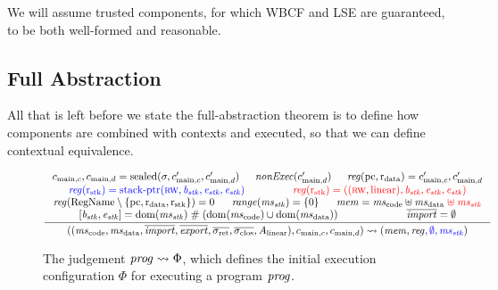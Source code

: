 \documentclass[acmsmall,screen]{acmart}\settopmatter{}
\renewcommand{\RegName}{\shareddom{RegName}}
\renewcommand{\nonExec}[1]{\plainfun{nonExec}{#1}}
\begin{document}
We will assume trusted components, for which WBCF and LSE are guaranteed, to be both well-formed and reasonable. 




\subsection{Full Abstraction}
All that is left before we state the full-abstraction theorem is to define how components are combined with contexts and executed, so that we can define contextual equivalence.

\begin{figure}
  \centering
  \begin{equation*}
    \inference{
      c_{\mathrm{main},c},c_{\mathrm{main},d}  = \sealed{\sigma, c_{\mathrm{main},c}', c_{\mathrm{main},d}'} &
      \nonExec{c_{\mathrm{main},d}'}&
      \reg(\pcreg,\rdata) = c_{\mathrm{main},c}', c_{\mathrm{main},d}' \\
      \src{\reg(\rstk) = \stkptr{\rw,\baddr_\stk,\eaddr_\stk,\eaddr_\stk}} & 
      \trg{\reg(\rstk) = ((\rw,\linear),\baddr_\stk,\eaddr_\stk,\eaddr_\stk)} \\
      \reg(\RegName \setminus \{\pcreg,\rdata,\rstk\}) = 0&
      \range{\ms_\stk} = \{0\}&
      \mem = \mscode \uplus \msdata \trg{\;\uplus\; \ms_\stk} \\
      [\baddr_\stk,\eaddr_\stk] = \dom(\ms_\stk ) \mathrel{\#} (\dom(\mscode) \cup \dom(\msdata)) &
      \overline{\var{import}} = \emptyset
    }{
      ((\mscode, \msdata, \overline{\var{import}}, \overline{\var{export}}, \sigrets, \sigcloss,A_\linear),  c_{\mathrm{main},c}, c_{\mathrm{main},d}) \rightsquigarrow (\mem, \reg\src{, \emptyset, \ms_\stk})
    }
  \end{equation*}
  \caption{The judgement $\mathit{prog} \rightsquigarrow \Phi$, which defines the initial execution configuration $\Phi$ for executing a program $\mathit{prog}$.}
  \label{fig:init-ec}
\end{figure}
\end{document}
